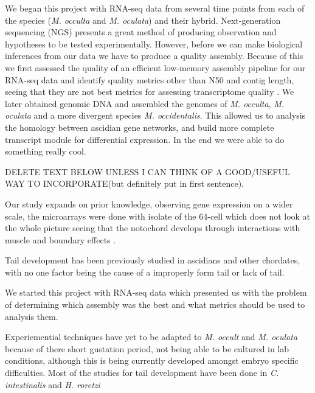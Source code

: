 We began this project with RNA-seq data from several time points from each of the species (\textit{M. occulta} and \textit{M. oculata}) and their hybrid. Next-generation sequencing (NGS) presents a great method of producing observation and hypotheses to be tested experimentally. However, before we can make biological inferences from our data we have to produce a quality assembly. Because of this we first assessed the quality of an efficient low-memory assembly pipeline for our RNA-seq data and identify quality metrics other than N50 and contig length, seeing that they are not best metrics for assessing transcriptome quality \cite{oneil_assessing_2013}. We later obtained genomic DNA and assembled the genomes of \textit{M. occulta}, \textit{M. oculata} and a more divergent species \textit{M. occidentalis}. This allowed us to analysis the homology between ascidian gene networks, and build more complete transcript module for differential expression\cite{vijay_challenges_2012}. In the end we were able to do something really cool.

DELETE TEXT BELOW UNLESS I CAN THINK OF A GOOD/USEFUL WAY TO INCORPORATE(but definitely put in first  sentence). 

Our study expands on prior knowledge, observing gene expression on a wider scale, the microarrays were done with isolate of the 64-cell which does not look at the whole picture seeing that the notochord develops through interactions with muscle and boundary effects \cite{keller_mechanisms_2000,veeman_chongmague_2008}.

Tail development has been previously studied in ascidians and other chordates, with no one factor being the cause of a improperly form tail or lack of tail. 

We started this project with RNA-seq data which presented us with the problem of determining which assembly was the best and what metrics should be used to analysis them.

Experiemential techniques have yet to be adapted to \textit{M. occult} and \textit{M. oculata} because of there short gustation period, not being able to be cultured in lab conditions, although this is being currently developed amongst embryo specific difficulties. Most of the studies for tail development have been done in \textit{C. intestinalis} and \textit{H. roretzi}  